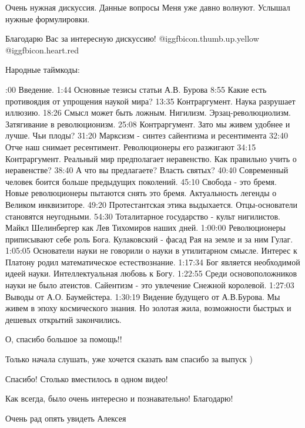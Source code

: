 \begin{multicols}{2}

Очень нужная дискуссия.
Данные вопросы Меня уже давно волнуют. Услышал нужные формулировки.

Благодарю Вас  за интересную дискуссию! @igg{fbicon.thumb.up.yellow} @igg{fbicon.heart.red}


Народные таймкоды:

:00 Введение. 
1:44 Основные тезисы статьи А.В. Бурова
8:55 Какие есть противоядия от упрощения наукой мира?
13:35 Контраргумент. Наука разрушает иллюзию.
18:26 Смысл может быть ложным. Нигилизм. Эрзац-революциолизм. Затягивание в революционизм.
25:08 Контраргумент. Зато мы живем удобнее и лучше. Чьи плоды?
31:20 Марксизм - синтез сайентизма и ресентимента
32:40 Отче наш снимает ресентимент. Революционеры его разжигают
34:15 Контраргумент. Реальный мир предполагает неравенство. Как правильно учить о неравенстве?
38:40 А что вы предлагаете? Власть святых? 
40:40 Современный человек боится больше предыдущих поколений.
45:10 Свобода - это бремя. Новые революционеры пытаются снять это бремя. Актуальность легенды о Великом инквизиторе.
49:20 Протестантская этика выдыхается. Отцы-основатели становятся неугодными. 
54:30 Тоталитарное государство - культ нигилистов. Майкл Шелинбергер как Лев Тихомиров наших дней.
1:00:00 Революционеры приписывают себе роль Бога. Кулаковский - фасад Рая на земле и за ним Гулаг. 
1:05:05 Основатели науки не говорили о науки в утилитарном смысле. Интерес к Платону родил математическое естествознание. 
1:17:34 Бог является необходимой идеей науки. Интеллектуальная любовь к Богу. 
1:22:55 Среди основоположников науки не было атеистов. Сайентизм - это увлечение Снежной королевой.
1:27:03 Выводы от А.О. Баумейстера. 
1:30:19 Видение будущего от А.В.Бурова. Мы живем в эпоху космического знания. Но золотая жила, возможности быстрых и дешевых открытий закончились.
\restorecr

О, спасибо большое за помощь!!

Только начала слушать, уже хочется сказать вам спасибо за выпуск )

Спасибо! Столько вместилось в одном видео!

Как всегда, было очень интересно и познавательно! Благодарю!

Очень рад опять увидеть Алексея


\end{multicols}
